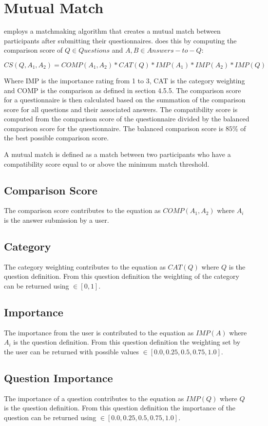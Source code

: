 \section{Mutual Match}
\label{sec:matching}
\Friending{} employs a matchmaking algorithm that creates a mutual match between participants after submitting their questionnaires.  \Friending{} does this by computing the comparison score of $Q \in Questions$ and $A,B \in Answers-to-Q$:

\begin{equation}
    CS(Q, A_1, A_2) = COMP(A_1, A_2) * CAT(Q) * IMP(A_1) * IMP(A_2) * IMP(Q) 
\end{equation}

Where IMP is the importance rating from 1 to 3, CAT is the category weighting and COMP is the comparison as defined in section 4.5.5.   The comparison score for a questionnaire is then calculated based on the summation of the comparison score for all questions and their associated answers.
The compatibility score is computed from the comparison score of the questionnaire divided by the balanced comparison score for the questionnaire.  The balanced comparison score is $85\%$ of the best possible comparison score.

A mutual match is defined as a match between two participants who have a compatibility score equal to or above the minimum match threshold.  

\subsection{Comparison Score}
\label{sec:score_comp}

The comparison score contributes to the equation as $COMP(A_1, A_2)$ where $A_i$ is the answer submission by a user.

\subsection{Category}
\label{sec:score_cat}

The category weighting contributes to the equation as $CAT(Q)$ where $Q$ is the question definition. From this question definition the weighting of the category can be returned using $\in [0, 1]$.

\subsection{Importance}
\label{sec:score_imp}

The importance from the user is contributed to the equation as $IMP(A)$ where $A_i$ is the question definition. From this question definition the weighting set by the user can be returned with possible values $\in [ 0.0, 0.25, 0.5, 0.75, 1.0 ]$.

\subsection{Question Importance}
\label{sec:scoreq_qimp}

The importance of a question contributes to the equation as $IMP(Q)$ where $Q$ is the question definition. From this question definition the importance of the question can be returned using $\in [ 0.0, 0.25, 0.5, 0.75, 1.0 ]$.